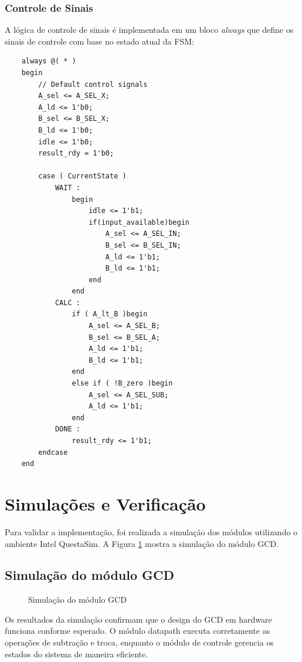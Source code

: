 \documentclass[a4paper,11pt]{article} %
\begin{document}
\subsubsection{Controle de Sinais}

A lógica de controle de sinais é implementada em um bloco \textit{always} que define os sinais de controle com base no estado atual da FSM:

\begin{verbatim}
    always @( * )
    begin
        // Default control signals
        A_sel <= A_SEL_X;
        A_ld <= 1'b0;
        B_sel <= B_SEL_X;
        B_ld <= 1'b0;
        idle <= 1'b0; 
        result_rdy = 1'b0;

        case ( CurrentState )
            WAIT :
                begin
                    idle <= 1'b1; 
                    if(input_available)begin
                        A_sel <= A_SEL_IN;
                        B_sel <= B_SEL_IN;
                        A_ld <= 1'b1;   
                        B_ld <= 1'b1;
                    end
                end
            CALC :
                if ( A_lt_B )begin
                    A_sel <= A_SEL_B;
                    B_sel <= B_SEL_A;
                    A_ld <= 1'b1;
                    B_ld <= 1'b1;
                end
                else if ( !B_zero )begin
                    A_sel <= A_SEL_SUB;
                    A_ld <= 1'b1;
                end
            DONE : 
                result_rdy <= 1'b1;
        endcase
    end
\end{verbatim}

\section{Simulações e Verificação}

Para validar a implementação, foi realizada a simulação dos módulos utilizando o ambiente Intel QuestaSim. A Figura \ref{fig:simulacao} mostra a simulação do módulo GCD.

\subsection{Simulação do módulo GCD}
\begin{figure}[ht]
    \centering
    \caption{Simulação do módulo GCD}
    \label{fig:simulacao}
\end{figure}

Os resultados da simulação confirmam que o design do GCD em hardware funciona conforme esperado. O módulo datapath executa corretamente as operações de subtração e troca, enquanto o módulo de controle gerencia os estados do sistema de maneira eficiente.
\end{document}
